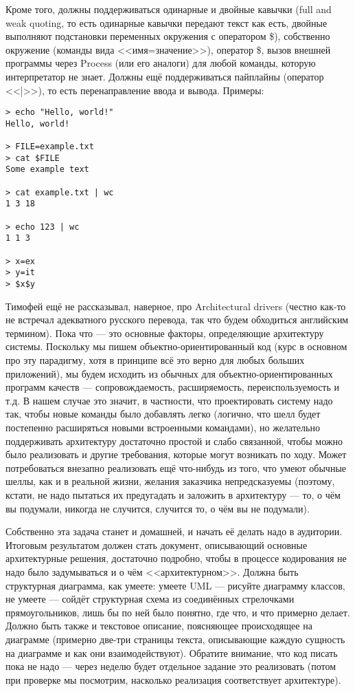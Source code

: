 \documentclass[a5paper]{article}
\begin{document}
Кроме того, должны поддерживаться одинарные и двойные кавычки (full and weak quoting, то есть одинарные кавычки передают текст как есть, двойные выполняют подстановки переменных окружения с оператором \$), собственно окружение (команды вида <<имя=значение>>), оператор \$, вызов внешней программы через Process (или его аналоги) для любой команды, которую интерпретатор не знает. Должны ещё поддерживаться пайплайны (оператор <<|>>), то есть перенаправление ввода и вывода. Примеры:

\begin{verbatim}
> echo "Hello, world!"
Hello, world!

> FILE=example.txt
> cat $FILE
Some example text

> cat example.txt | wc
1 3 18

> echo 123 | wc
1 1 3

> x=ex
> y=it
> $x$y
\end{verbatim}

Тимофей ещё не рассказывал, наверное, про Architectural drivers (честно как-то не встречал адекватного русского перевода, так что будем обходиться английским термином). Пока что --- это основные факторы, определяющие архитектуру системы. Поскольку мы пишем объектно-ориентированный код (курс в основном про эту парадигму, хотя в принципе всё это верно для любых больших приложений), мы будем исходить из обычных для объектно-ориентированных программ качеств --- сопровождаемость, расширяемость, переиспользуемость и т.д. В нашем случае это значит, в частности, что проектировать систему надо так, чтобы новые команды было добавлять легко (логично, что шелл будет постепенно расширяться новыми встроенными командами), но желательно поддерживать архитектуру достаточно простой и слабо связанной, чтобы можно было реализовать и другие требования, которые могут возникать по ходу. Может потребоваться внезапно реализовать ещё что-нибудь из того, что умеют обычные шеллы, как и в реальной жизни, желания заказчика непредсказуемы (поэтому, кстати, не надо пытаться их предугадать и заложить в архитектуру --- то, о чём вы подумали, никогда не случится, случится то, о чём вы не подумали).

Собственно эта задача станет и домашней, и начать её делать надо в аудитории. Итоговым результатом должен стать документ, описывающий основные архитектурные решения, достаточно подробно, чтобы в процессе кодирования не надо было задумываться и о чём <<архитектурном>>. Должна быть структурная диаграмма, как умеете: умеете UML --- рисуйте диаграмму классов, не умеете --- сойдёт структурная схема из соединённых стрелочками прямоугольников, лишь бы по ней было понятно, где что, и что примерно делает. Должно быть также и текстовое описание, поясняющее происходящее на диаграмме (примерно две-три страницы текста, описывающие каждую сущность на диаграмме и как они взаимодействуют). Обратите внимание, что код писать пока не надо --- через неделю будет отдельное задание это реализовать (потом при проверке мы посмотрим, насколько реализация соответствует архитектуре).
\end{document}
